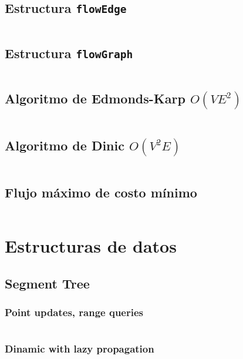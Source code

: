 \documentclass[11pt]{article}
\begin{document}
		\subsection{Estructura \texttt{flowEdge}}
		\inputminted[tabsize=2,breaklines,firstline=4,lastline=17,fontsize=\small]{c++}{flow.cpp}
		
		\subsection{Estructura \texttt{flowGraph}}
		\inputminted[tabsize=2,breaklines,firstline=19,lastline=38,fontsize=\small]{c++}{flow.cpp}
		
		\subsection{Algoritmo de Edmonds-Karp $O(VE^2)$}
		\inputminted[tabsize=2,breaklines,firstline=82,lastline=108,fontsize=\small]{c++}{flow.cpp}
		
		\subsection{Algoritmo de Dinic $O(V^2E)$}
		\inputminted[tabsize=2,breaklines,firstline=40,lastline=80,fontsize=\small]{c++}{flow.cpp}
		
		\subsection{Flujo máximo de costo mínimo}
		\inputminted[tabsize=2,breaklines,firstline=110,lastline=145,fontsize=\small]{c++}{flow.cpp}
		
	\newpage
	\section{Estructuras de datos}
		\subsection{Segment Tree}
			\subsubsection{Point updates, range queries}
			\inputminted[tabsize=2,breaklines,firstline=4,lastline=37,fontsize=\small]{c++}{queries.cpp}
			
			\subsubsection{Dinamic with lazy propagation}
			\inputminted[tabsize=2,breaklines,firstline=39,lastline=90,fontsize=\small]{c++}{queries.cpp}
		
\end{document}
